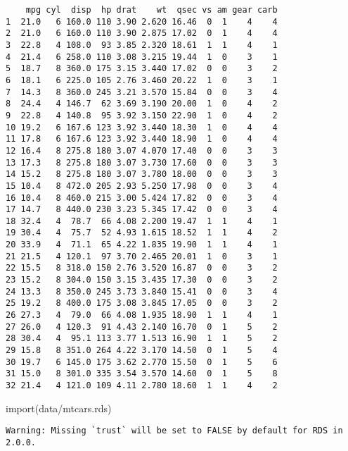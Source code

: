 \documentclass[
  letterpaper,
  DIV=11,
  numbers=noendperiod]{scrreprt}
\newenvironment{Shaded}{\begin{snugshade}}{\end{snugshade}}
\newcommand{\FunctionTok}[1]{\textcolor[rgb]{0.28,0.35,0.67}{#1}}
\newcommand{\NormalTok}[1]{\textcolor[rgb]{0.00,0.23,0.31}{#1}}
\newcommand{\StringTok}[1]{\textcolor[rgb]{0.13,0.47,0.30}{#1}}
\begin{document}
\begin{verbatim}
    mpg cyl  disp  hp drat    wt  qsec vs am gear carb
1  21.0   6 160.0 110 3.90 2.620 16.46  0  1    4    4
2  21.0   6 160.0 110 3.90 2.875 17.02  0  1    4    4
3  22.8   4 108.0  93 3.85 2.320 18.61  1  1    4    1
4  21.4   6 258.0 110 3.08 3.215 19.44  1  0    3    1
5  18.7   8 360.0 175 3.15 3.440 17.02  0  0    3    2
6  18.1   6 225.0 105 2.76 3.460 20.22  1  0    3    1
7  14.3   8 360.0 245 3.21 3.570 15.84  0  0    3    4
8  24.4   4 146.7  62 3.69 3.190 20.00  1  0    4    2
9  22.8   4 140.8  95 3.92 3.150 22.90  1  0    4    2
10 19.2   6 167.6 123 3.92 3.440 18.30  1  0    4    4
11 17.8   6 167.6 123 3.92 3.440 18.90  1  0    4    4
12 16.4   8 275.8 180 3.07 4.070 17.40  0  0    3    3
13 17.3   8 275.8 180 3.07 3.730 17.60  0  0    3    3
14 15.2   8 275.8 180 3.07 3.780 18.00  0  0    3    3
15 10.4   8 472.0 205 2.93 5.250 17.98  0  0    3    4
16 10.4   8 460.0 215 3.00 5.424 17.82  0  0    3    4
17 14.7   8 440.0 230 3.23 5.345 17.42  0  0    3    4
18 32.4   4  78.7  66 4.08 2.200 19.47  1  1    4    1
19 30.4   4  75.7  52 4.93 1.615 18.52  1  1    4    2
20 33.9   4  71.1  65 4.22 1.835 19.90  1  1    4    1
21 21.5   4 120.1  97 3.70 2.465 20.01  1  0    3    1
22 15.5   8 318.0 150 2.76 3.520 16.87  0  0    3    2
23 15.2   8 304.0 150 3.15 3.435 17.30  0  0    3    2
24 13.3   8 350.0 245 3.73 3.840 15.41  0  0    3    4
25 19.2   8 400.0 175 3.08 3.845 17.05  0  0    3    2
26 27.3   4  79.0  66 4.08 1.935 18.90  1  1    4    1
27 26.0   4 120.3  91 4.43 2.140 16.70  0  1    5    2
28 30.4   4  95.1 113 3.77 1.513 16.90  1  1    5    2
29 15.8   8 351.0 264 4.22 3.170 14.50  0  1    5    4
30 19.7   6 145.0 175 3.62 2.770 15.50  0  1    5    6
31 15.0   8 301.0 335 3.54 3.570 14.60  0  1    5    8
32 21.4   4 121.0 109 4.11 2.780 18.60  1  1    4    2
\end{verbatim}

\begin{Shaded}
\begin{Highlighting}[]
\FunctionTok{import}\NormalTok{(}\StringTok{\textquotesingle{}data/mtcars.rds\textquotesingle{}}\NormalTok{)}
\end{Highlighting}
\end{Shaded}

\begin{verbatim}
Warning: Missing `trust` will be set to FALSE by default for RDS in 2.0.0.
\end{verbatim}
\end{document}
